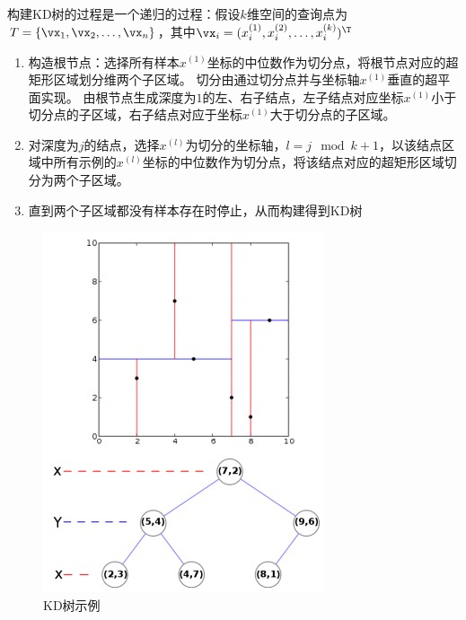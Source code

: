 \documentclass[logo,reportComp]{thesis}
\begin{document}
构建KD树的过程是一个递归的过程：假设$k$维空间的查询点为$T=\{\vx_1,\vx_2,\ldots,\vx_n\}$，其中$\vx_i=(x_i^{(1)},x_i^{(2)},\ldots,x_i^{(k)})^\T$
\begin{enumerate}
	\item 构造根节点：选择所有样本$x^{(1)}$坐标的中位数作为切分点，将根节点对应的超矩形区域划分维两个子区域。
	切分由通过切分点并与坐标轴$x^{(1)}$垂直的超平面实现。
	由根节点生成深度为$1$的左、右子结点，左子结点对应坐标$x^{(1)}$小于切分点的子区域，右子结点对应于坐标$x^{(1)}$大于切分点的子区域。
	\item 对深度为$j$的结点，选择$x^{(l)}$为切分的坐标轴，$l=j\mod k+1$，以该结点区域中所有示例的$x^{(l)}$坐标的中位数作为切分点，将该结点对应的超矩形区域切分为两个子区域。
	\item 直到两个子区域都没有样本存在时停止，从而构建得到KD树
\end{enumerate}
\begin{figure}[H]
\centering
\includegraphics[width=0.4\linewidth]{fig/kdtree.jpg}
\caption{KD树示例}
\label{fig:kdtree}
\end{figure}
\end{document}

